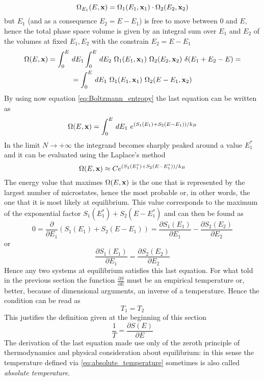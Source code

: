 \begin{equation*} 
    \Omega_{E_1}(E, \mathbf{x}) = \Omega_1(E_1, \mathbf{x}_1) \cdot \Omega_2(E_2, \mathbf{x}_2)
\end{equation*}
but $E_1$ (and as a consequence $E_2 = E - E_1$) is free to move between $0$ and $E$, hence the total phase space volume is given by an integral sum over $E_1$ and $E_2$ of the volumes at fixed $E_1, E_2$ with the constrain $E_2 = E - E_1$ \\
\begin{gather*}
    \Omega(E, \mathbf{x}) = \int_0^E \, dE_1 \int_0^E \, dE_2 \ \Omega_1(E_1, \mathbf{x}_1) \ \Omega_2(E_2, \mathbf{x}_2) \ \delta(E_1 + E_2 - E) = \\
    = \int_0^E \, dE_1 \ \Omega_1(E_1, \mathbf{x}_1) \ \Omega_2(E - E_1, \mathbf{x}_2)
\end{gather*}
By using now equation \ref{eq:Boltzmann_entropy} the last equation can be written as 
\begin{equation*}
    \Omega(E, \mathbf{x}) = \int_0^E \, dE_1 \ e^{(S_1(E_1) + S_2(E-E_1))/k_B}
\end{equation*}
In the limit $N \to +\infty$ the integrand becomes sharply peaked around a value $E_1^*$ and it can be evaluated using the Laplace's method
\begin{equation*}
    \Omega(E, \mathbf{x}) \approx C e^{(S_1(E_1^*) + S_2(E-E_1^*))/k_B}
\end{equation*}
The energy value that maximes $\Omega(E, \mathbf{x})$ is the one that is represented by the largest number of microstates, hence the most probable or, in other words, the one that it is most likely at equilibrium. This value corresponds to the maximum of the exponential factor $S_1(E_1^*) + S_2(E-E_1^*)$ and can then be found as 
\begin{equation*}
    0 = \frac{\partial}{\partial E_1}(S_1(E_1) + S_2(E-E_1)) = \frac{\partial S_1(E_1)}{\partial E_1} - \frac{\partial S_2(E_2)}{\partial E_2} 
\end{equation*}
or
\begin{equation*}
    \frac{\partial S_1(E_1)}{\partial E_1} = \frac{\partial S_2(E_2)}{\partial E_2} 
\end{equation*}
Hence any two systems at equilibrium satisfies this last equation. For what told in the previous section the function 
$\frac{\partial S}{\partial E}$ must be an empirical temperature or, better, because of dimensional arguments, an inverse of a temperature. Hence the condition can be read as 
\begin{equation*}
    T_1 = T_2
\end{equation*}
This justifies the definition given at the beginning of this section 
\begin{equation}
    \frac{1}{T} = \frac{\partial S(E)}{\partial E}
    \label{eq:absolute_temperature}
\end{equation}
The derivation of the last equation made use only of the zeroth principle of thermodynamics and physical consideration about equilibrium: in this sense the temperature defined via \ref{eq:absolute_temperature} sometimes is also called \emph{absolute temperature}. \\

